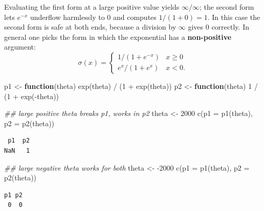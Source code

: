 \documentclass[
  letterpaper,
  DIV=11,
  numbers=noendperiod]{scrreprt}
\newenvironment{Shaded}{\begin{snugshade}}{\end{snugshade}}
\newcommand{\AttributeTok}[1]{\textcolor[rgb]{0.40,0.45,0.13}{#1}}
\newcommand{\ControlFlowTok}[1]{\textcolor[rgb]{0.00,0.23,0.31}{\textbf{#1}}}
\newcommand{\DecValTok}[1]{\textcolor[rgb]{0.68,0.00,0.00}{#1}}
\newcommand{\DocumentationTok}[1]{\textcolor[rgb]{0.37,0.37,0.37}{\textit{#1}}}
\newcommand{\FunctionTok}[1]{\textcolor[rgb]{0.28,0.35,0.67}{#1}}
\newcommand{\NormalTok}[1]{\textcolor[rgb]{0.00,0.23,0.31}{#1}}
\newcommand{\OtherTok}[1]{\textcolor[rgb]{0.00,0.23,0.31}{#1}}
\newcommand{\SpecialCharTok}[1]{\textcolor[rgb]{0.37,0.37,0.37}{#1}}
\begin{document}
Evaluating the first form at a large positive value yields
\(\infty/\infty\); the second form lets \(e^{-x}\) underflow harmlessly
to \(0\) and computes \(1/(1+0) = 1\). In this case the second form is
safe at both ends, because a division by \(\infty\) gives \(0\)
correctly. In general one picks the form in which the exponential has a
\textbf{non-positive} argument: \[
\sigma(x) = \begin{cases} 1/(1+e^{-x}) & x \ge 0\\ e^{x}/(1+e^{x}) & x < 0.\end{cases}
\]

\begin{Shaded}
\begin{Highlighting}[]
\NormalTok{p1 }\OtherTok{\textless{}{-}} \ControlFlowTok{function}\NormalTok{(theta) }\FunctionTok{exp}\NormalTok{(theta) }\SpecialCharTok{/}\NormalTok{ (}\DecValTok{1} \SpecialCharTok{+} \FunctionTok{exp}\NormalTok{(theta))}
\NormalTok{p2 }\OtherTok{\textless{}{-}} \ControlFlowTok{function}\NormalTok{(theta) }\DecValTok{1} \SpecialCharTok{/}\NormalTok{ (}\DecValTok{1} \SpecialCharTok{+} \FunctionTok{exp}\NormalTok{(}\SpecialCharTok{{-}}\NormalTok{theta))}

\DocumentationTok{\#\# large positive theta breaks p1, works in p2}
\NormalTok{theta }\OtherTok{\textless{}{-}} \DecValTok{2000}
\FunctionTok{c}\NormalTok{(}\AttributeTok{p1 =} \FunctionTok{p1}\NormalTok{(theta), }\AttributeTok{p2 =} \FunctionTok{p2}\NormalTok{(theta))}
\end{Highlighting}
\end{Shaded}

\begin{verbatim}
 p1  p2 
NaN   1 
\end{verbatim}

\begin{Shaded}
\begin{Highlighting}[]
\DocumentationTok{\#\# large negative theta works for both}
\NormalTok{theta }\OtherTok{\textless{}{-}} \SpecialCharTok{{-}}\DecValTok{2000}
\FunctionTok{c}\NormalTok{(}\AttributeTok{p1 =} \FunctionTok{p1}\NormalTok{(theta), }\AttributeTok{p2 =} \FunctionTok{p2}\NormalTok{(theta))}
\end{Highlighting}
\end{Shaded}

\begin{verbatim}
p1 p2 
 0  0 
\end{verbatim}
\end{document}
